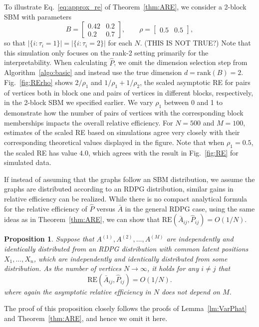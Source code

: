 \documentclass[10pt,letterpaper]{article}
\newtheorem{proposition}[fact]{Proposition}
\renewcommand{\hat}{\widehat}
\begin{document}
To illustrate Eq.~\ref{eq:approx_re} of Theorem~\ref{thm:ARE}, we consider a 2-block SBM with parameters
\begin{equation}
B = \begin{bmatrix}
0.42 & 0.2 \\
0.2 & 0.7
\end{bmatrix}
,\qquad \rho = \begin{bmatrix}
0.5 & 0.5
\end{bmatrix},
\label{eq:sim_setting}
\end{equation}
so that $|\{i:\tau_i=1\}|=|\{i:\tau_i=2\}|$ for each $N$. (THIS IS NOT TRUE?)
Note that this simulation only focuses on the rank-2 setting primarily for the interpretability.
When calculating $\hat{P}$, we omit the dimension selection step from Algorithm~\ref{algo:basic} and instead use the true dimension $d = \mathrm{rank}(B) = 2$.
Fig.~\ref{fig:RErho} shows $2/\rho_1$ and $1/\rho_1+1/\rho_2$, the scaled asymptotic RE for pairs of vertices both in block one and pairs of vertices in different blocks, respectively, in the 2-block SBM we specified earlier.
We vary $\rho_1$ between 0 and 1 to demonstrate how the number of pairs of vertices with the corresponding block memberships impacts the overall relative efficiency.
For $N=500$ and $M=100$, estimates of the scaled RE based on simulations agree very closely with their corresponding theoretical values displayed in the figure. Note that when $\rho_1 = 0.5$, the scaled RE has value $4.0$, which agrees with the result in Fig.~\ref{fig:RE} for simulated data.



If instead of assuming that the graphs follow an SBM distribution, we assume the graphs are distributed according to an RDPG distribution, similar gains in relative efficiency can be realized.
While there is no compact analytical formula for the relative efficiency of $\hat{P}$ versus $\bar{A}$ in the general RDPG case, using the same ideas as in Theorem~\ref{thm:ARE}, we can show that $\mathrm{RE}(\bar{A}_{ij},\hat{P}_{ij}) = O(1/N)$.

\begin{proposition}
Suppose that $A^{(1)},A^{(2)},\dotsc,A^{(M)}$ are independently and identically distributed from an RDPG distribution with common latent positions $X_1,\dotsc,X_n$, which are independently and identically distributed from some distribution.
As the number of vertices $N\to\infty$, it holds for any $i\neq j$ that 
\[
    \mathrm{RE}(\bar{A}_{ij},\hat{P}_{ij}) = O(1/N).
\]
where again the asymptotic relative efficiency in $N$ does not depend on $M$.
\end{proposition}
The proof of this proposition closely follows the proofs of Lemma~\ref{lm:VarPhat} and Theorem~\ref{thm:ARE}, and hence we omit it here.
\end{document}

